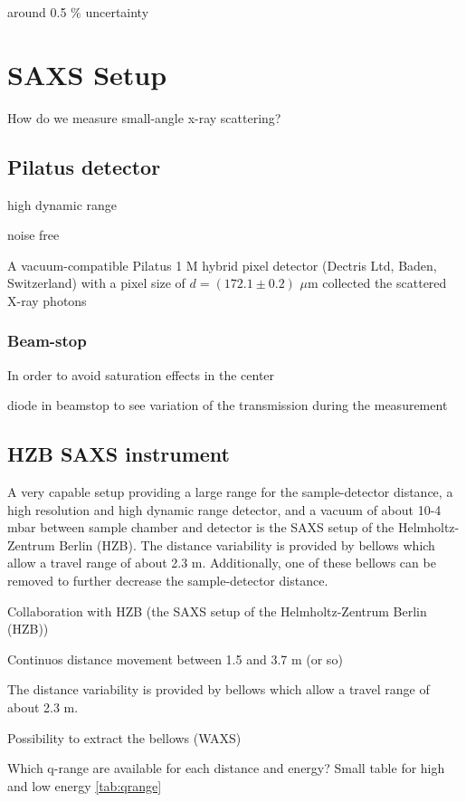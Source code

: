 around 0.5 $\%$ uncertainty

\section{SAXS Setup}

How do we measure small-angle x-ray scattering?

\subsection{Pilatus detector}
high dynamic range

noise free

A vacuum-compatible Pilatus 1 M hybrid pixel detector (Dectris Ltd, Baden, Switzerland) with a pixel size of $d = (172.1 \pm 0.2)$ $\mu$m collected the scattered X-ray photons

\subsubsection{Beam-stop}

In order to avoid saturation effects in the center

diode in beamstop to see variation of the transmission during the measurement

\subsection{HZB SAXS instrument}

A very capable setup providing a large range for the sample-detector distance, a high resolution and high dynamic range detector, and a vacuum of about 10-4 mbar between sample chamber and detector is the SAXS setup of the Helmholtz-Zentrum Berlin (HZB). The distance variability is provided by bellows which allow a travel range of about 2.3 m. Additionally, one of these bellows can be removed to further decrease the sample-detector distance.


Collaboration with HZB (the SAXS setup of the Helmholtz-Zentrum Berlin (HZB))

Continuos distance movement between 1.5 and 3.7 m (or so)

The distance variability is provided by bellows which allow a travel range of about 2.3 m. 

Possibility to extract the bellows (WAXS)

Which q-range are available for each distance and energy? Small table for high and low energy \ref{tab:qrange}

